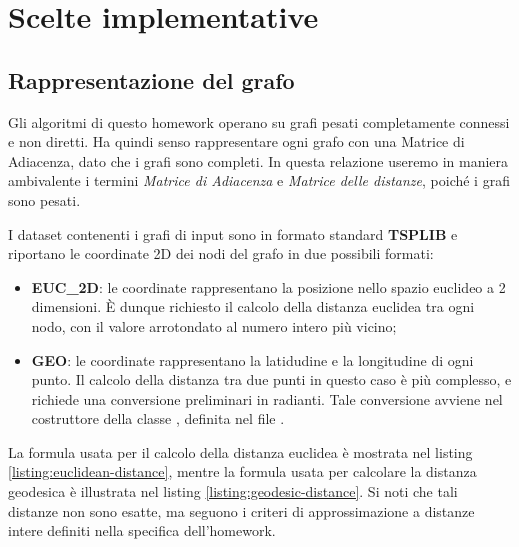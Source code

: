 \section{Scelte implementative}
\label{cap:implementation-choices}

\subsection{Rappresentazione del grafo}
\label{sub:graph-representation}

Gli algoritmi di questo homework operano su grafi pesati completamente connessi e non diretti. Ha quindi senso rappresentare ogni grafo con una Matrice di Adiacenza, dato che i grafi sono completi. In questa relazione useremo in maniera ambivalente i termini \textit{Matrice di Adiacenza} e \textit{Matrice delle distanze}, poiché i grafi sono pesati.

\noindent I dataset contenenti i grafi di input sono in formato standard \textbf{TSPLIB } e riportano le coordinate 2D dei nodi del grafo in due possibili formati:

\begin{itemize}
    \item \textbf{EUC\_2D}: le coordinate rappresentano la posizione nello spazio euclideo a 2 dimensioni. È dunque richiesto il calcolo della distanza euclidea tra ogni nodo, con il valore arrotondato al numero intero più vicino;
    \item \textbf{GEO}: le coordinate rappresentano la latidudine e la longitudine di ogni punto. Il calcolo della distanza tra due punti in questo caso è più complesso, e richiede una conversione preliminari in radianti. Tale conversione avviene nel costruttore della classe , definita nel file .
\end{itemize}

La formula usata per il calcolo della distanza euclidea è mostrata nel listing \ref{listing:euclidean-distance}, mentre la formula usata per calcolare la distanza geodesica è illustrata nel listing \ref{listing:geodesic-distance}. Si noti che tali distanze non sono esatte, ma seguono i criteri di approssimazione a distanze intere definiti nella specifica dell'homework.

